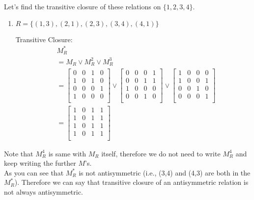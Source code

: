 \documentclass[12pt]{article}
\begin{document}
Let's find the transitive closure of these relations on \( \{1, 2, 3, 4\} \).

\begin{enumerate}
    \item \( R = \{(1, 3),(2, 1),(2, 3),(3, 4),(4, 1)\} \)

    Transitive Closure:
    \begin{align*}
    &M_R^* \\
    &= M_R \lor M_R^2  \lor M_R^3 \\
    &= \begin{bmatrix}
    0 & 0 & 1 & 0 \\
    1 & 0 & 1 & 0 \\
    0 & 0 & 0 & 1 \\
    1 & 0 & 0 & 0 \\
    \end{bmatrix} \lor \begin{bmatrix}
    0 & 0 & 0 & 1\\
    0 & 0 & 1 & 1 \\
    1 & 0 & 0 & 0 \\
    0 & 0 & 1 & 0 \\
    \end{bmatrix} \lor \begin{bmatrix}
    1 & 0 & 0 & 0 \\
    1 & 0 & 0 & 1 \\
    0 & 0 & 1 & 0 \\
    0 & 0 & 0 & 1 \\
    \end{bmatrix} \\
    &= \begin{bmatrix}
    1 & 0 & 1 & 1 \\
    1 & 0 & 1 & 1 \\
    1 & 0 & 1 & 1 \\
    1 & 0 & 1 & 1 \\
    \end{bmatrix}
    \end{align*}
\end{enumerate}

Note that \(M_R^4\) is same with \(M_R\) itself, therefore we do not need to write \(M_R^4\) and keep writing the further \(M\)'s.\\

As you can see that \(M_R^*\) is not antisymmetric (i.e., (3,4) and (4,3) are both in the \(M_R^*\)). Therefore we can say that transitive closure of an antisymmetric relation is not always antisymmetric.\\
\end{document}
